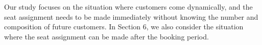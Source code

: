 

Our study focuses on the situation where customers come dynamically, and the seat assignment needs to be made immediately without knowing the number and composition of future customers. In Section 6, we also consider the situation where the seat assignment can be made after the booking period.




